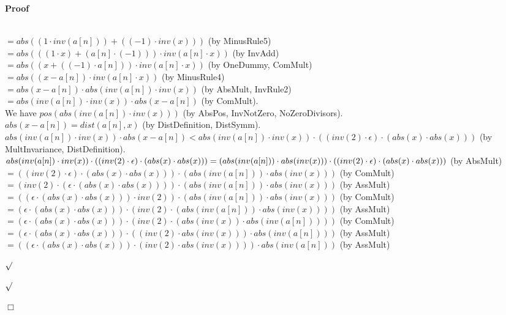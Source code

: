 \documentclass{article}
\newenvironment{forthel}{\begin{leftbar}}{\end{leftbar}}
\newenvironment{proof}{\noindent\textbf{Proof\ }}{\hspace*{\fill}$\Box$\medskip}
\newenvironment{subproof}{\begin{list}{}{}
		\item[\text{Proof}]}{\hfill $\surd$ \end{list}}
\newcommand{\dotequal}{=}
\begin{document}
\begin{forthel}
\begin{proof}
\begin{subproof}
\begin{subproof}
	\\$\dotequal abs((1 \cdot inv(a[n])) + ((-1) \cdot inv(x)))$ (by MinusRule5)
	\\$\dotequal abs(((1 \cdot x) + (a[n] \cdot (-1))) \cdot inv(a[n] \cdot x))$ (by InvAdd)
	\\$\dotequal abs((x + ((-1) \cdot a[n])) \cdot inv(a[n] \cdot x))$ (by OneDummy, ComMult)
	\\$\dotequal abs((x - a[n]) \cdot inv(a[n] \cdot x))$ (by MinusRule4)
	\\$\dotequal abs(x - a[n]) \cdot abs(inv(a[n]) \cdot inv(x))$ (by AbsMult, InvRule2)
	\\$\dotequal abs(inv(a[n]) \cdot inv(x)) \cdot abs(x - a[n])$ (by ComMult).
	\\We have $pos(abs(inv(a[n]) \cdot inv(x)))$ (by AbsPos, InvNotZero, NoZeroDivisors).
	\\$abs(x - a[n]) = dist(a[n],x)$ (by DistDefinition, DistSymm).
	\\$abs(inv(a[n]) \cdot inv(x)) \cdot abs(x - a[n]) < abs(inv(a[n]) \cdot inv(x)) \cdot ((inv(2) \cdot \epsilon) \cdot (abs(x) \cdot abs(x)))$ (by MultInvariance, DistDefinition).
	\\$abs(inv(a[n]) \cdot inv(x)) \cdot ((inv(2) \cdot \epsilon) \cdot (abs(x) \cdot abs(x))) \\ \dotequal (abs(inv(a[n])) \cdot abs(inv(x))) \cdot ((inv(2) \cdot \epsilon) \cdot (abs(x) \cdot abs(x)))$ (by AbsMult)
	\\$\dotequal ((inv(2) \cdot \epsilon) \cdot (abs(x) \cdot abs(x))) \cdot (abs(inv(a[n])) \cdot abs(inv(x)))$ (by ComMult)
	\\$\dotequal (inv(2) \cdot (\epsilon \cdot (abs(x) \cdot abs(x)))) \cdot (abs(inv(a[n])) \cdot abs(inv(x)))$ (by AssMult)
	\\$\dotequal ((\epsilon \cdot (abs(x) \cdot abs(x))) \cdot inv(2)) \cdot (abs(inv(a[n])) \cdot abs(inv(x)))$ (by ComMult) 
	\\$\dotequal (\epsilon \cdot (abs(x) \cdot abs(x))) \cdot (inv(2) \cdot (abs(inv(a[n])) \cdot abs(inv(x))))$ (by AssMult)
	\\$\dotequal (\epsilon \cdot (abs(x) \cdot abs(x))) \cdot (inv(2) \cdot (abs(inv(x)) \cdot abs(inv(a[n]))))$ (by ComMult)
	\\$\dotequal (\epsilon \cdot (abs(x) \cdot abs(x))) \cdot ((inv(2) \cdot abs(inv(x))) \cdot abs(inv(a[n])))$ (by AssMult)
	\\$\dotequal ((\epsilon \cdot (abs(x) \cdot abs(x))) \cdot (inv(2) \cdot abs(inv(x)))) \cdot abs(inv(a[n]))$ (by AssMult)

\end{subproof}
\end{subproof}
\end{proof}
\end{forthel}
\end{document}
